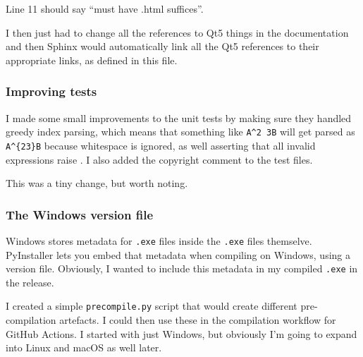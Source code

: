 \documentclass[../development.tex]{subfiles}
\begin{document}

Line 11 should say \enquote{must have .html suffices}.


I then just had to change all the references to Qt5 things in the documentation and then Sphinx would automatically link all the Qt5 references to their appropriate links, as defined in this file.

\subsubsection{Improving tests\label{development:preparing-for-v0.2.1:improving-tests}}

I made some small improvements to the unit tests by making sure they handled greedy index parsing, which means that something like \texttt{A\textasciicircum2 3B} will get parsed as \texttt{A\textasciicircum\{23\}B} because whitespace is ignored, as well asserting that all invalid expressions raise . I also added the copyright comment to the test files.

This was a tiny change, but worth noting.



\subsubsection{The Windows version file\label{development:preparing-for-v0.2.1:the-windows-version-file}}

Windows stores metadata for \texttt{.exe} files inside the \texttt{.exe} files themselve\cite{msdocs-version-information-structures}\cite{msdocs-versioninfo-resource}. PyInstaller lets you embed that metadata when compiling on Windows, using a version file\cite{pyintaller-4.10-capturing-windows-version-data}. Obviously, I wanted to include this metadata in my compiled \texttt{.exe} in the release.

I created a simple \texttt{precompile.py} script that would create different pre-compilation artefacts. I could then use these in the compilation workflow for GitHub Actions. I started with just Windows, but obviously I'm going to expand into Linux and macOS as well later.
\end{document}
